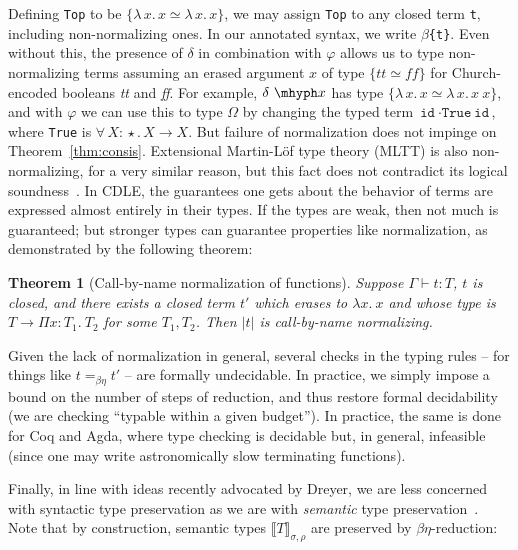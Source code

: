\documentclass{article}
\newcommand{\abs}[4]{{#1}\, #2\! : \! #3.\, #4}
\newcommand{\absu}[3]{{#1}\, #2.\, #3}
\newcommand{\interp}[1]{\llbracket #1 \rrbracket}
\newtheorem{theorem}{Theorem}
\begin{document}
Defining \verb|Top| to be $\{\absu{\lambda}{x}{x} \simeq
\absu{\lambda}{x}{x}\}$, we may assign \verb|Top| to any closed term \verb|t|,
including non-normalizing ones. In our annotated syntax, we write
\texttt{\(\beta\)\{t\}}. Even without this, the presence of $\delta$ in
combination with $\varphi$ allows us to type non-normalizing terms assuming an
erased argument $x$ of type $\{ \textit{tt} \simeq \textit{ff} \}$ for
Church-encoded booleans \textit{tt} and \textit{ff}. For example, $\delta\ \mhyph x$
has type \(\{\absu{\lambda}{x}{x} \simeq \absu{\lambda}{x}{x\ x}\}\), and with
$\varphi$ we can use this to type $\Omega$ by changing the typed term
\(\texttt{id}\ \cdot\texttt{True}\ \texttt{id}\), where \verb|True| is
\(\abs{\forall}{X}{\star}{X \to X}\). But failure of normalization does not
impinge on Theorem~\ref{thm:consis}. Extensional Martin-L\"of type theory (MLTT)
is also non-normalizing, for a very similar reason, but this fact does not contradict
its logical soundness~\cite{dybjer16}. In CDLE, the guarantees one gets about
the behavior of terms are expressed almost entirely in their types. If the types
are weak, then not much is guaranteed; but stronger types can guarantee
properties like normalization, as demonstrated by the following theorem:

\begin{theorem}[Call-by-name normalization of functions]
  \label{thm:cedille-termination}
  Suppose \(\Gamma\vdash t : T\), $t$ is closed, and there exists a closed term
  $t'$ which erases to \(\lambda x.\ x\) and whose type is $T \to \Pi x : T_1.\
  T_2$ for some $T_1, T_2$. Then $|t|$ is call-by-name normalizing.
  \end{theorem}

Given the lack of normalization in general, several checks in the typing rules --
for things like $t =_{\beta\eta} t'$ -- are formally undecidable.  In
practice, we simply impose a bound on the number of steps of reduction,
and thus restore formal decidability (we are checking ``typable within
a given budget'').  In practice, the same is done for Coq and Agda,
where type checking is decidable but, in general, infeasible (since one
may write astronomically slow terminating functions).

Finally, in line with ideas recently advocated by Dreyer, we
are less concerned with syntactic
type preservation as we are with \emph{semantic} type
preservation~\cite{dreyer18}.
Note that by construction, semantic types $\interp{T}_{\sigma,\rho}$ are
preserved by $\beta\eta$-reduction:
\end{document}

